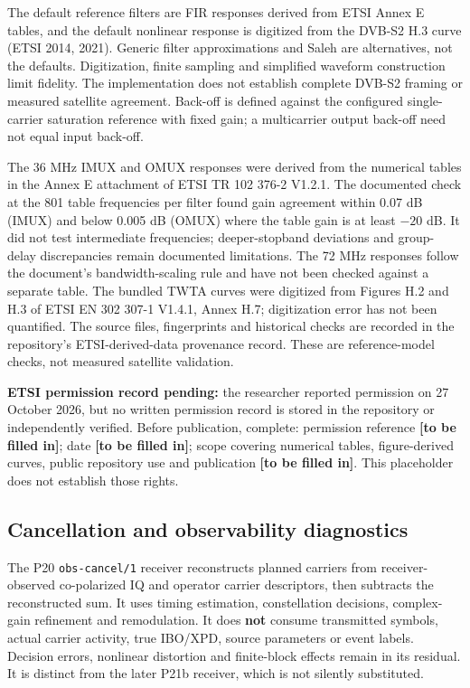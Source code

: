 \documentclass[
  10pt,
]{article}
\begin{document}
The default reference filters are FIR responses derived from ETSI Annex
E tables, and the default nonlinear response is digitized from the
DVB-S2 H.3 curve (ETSI 2014, 2021). Generic filter approximations and
Saleh are alternatives, not the defaults. Digitization, finite sampling
and simplified waveform construction limit fidelity. The implementation
does not establish complete DVB-S2 framing or measured satellite
agreement. Back-off is defined against the configured single-carrier
saturation reference with fixed gain; a multicarrier output back-off
need not equal input back-off.

The 36 MHz IMUX and OMUX responses were derived from the numerical
tables in the Annex E attachment of ETSI TR 102 376-2 V1.2.1. The
documented check at the 801 table frequencies per filter found gain
agreement within 0.07 dB (IMUX) and below 0.005 dB (OMUX) where the
table gain is at least \(-20\) dB. It did not test intermediate
frequencies; deeper-stopband deviations and group-delay discrepancies
remain documented limitations. The 72 MHz responses follow the
document's bandwidth-scaling rule and have not been checked against a
separate table. The bundled TWTA curves were digitized from Figures H.2
and H.3 of ETSI EN 302 307-1 V1.4.1, Annex H.7; digitization error has
not been quantified. The source files, fingerprints and historical
checks are recorded in the repository's ETSI-derived-data provenance
record. These are reference-model checks, not measured satellite
validation.

\textbf{ETSI permission record pending:} the researcher reported
permission on 27 October 2026, but no written permission record is
stored in the repository or independently verified. Before publication,
complete: permission reference \textbf{{[}to be filled in{]}}; date
\textbf{{[}to be filled in{]}}; scope covering numerical tables,
figure-derived curves, public repository use and publication
\textbf{{[}to be filled in{]}}. This placeholder does not establish
those rights.

\subsection{Cancellation and observability
diagnostics}\label{cancellation-and-observability-diagnostics}

The P20 \texttt{obs-cancel/1} receiver reconstructs planned carriers
from receiver-observed co-polarized IQ and operator carrier descriptors,
then subtracts the reconstructed sum. It uses timing estimation,
constellation decisions, complex-gain refinement and remodulation. It
does \textbf{not} consume transmitted symbols, actual carrier activity,
true IBO/XPD, source parameters or event labels. Decision errors,
nonlinear distortion and finite-block effects remain in its residual. It
is distinct from the later P21b receiver, which is not silently
substituted.
\end{document}
